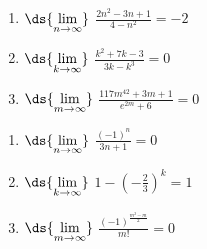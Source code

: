 \documentclass{ximera}
\begin{document}
\begin{multicols}{3}
\begin{enumerate}
\setcounter{enumi}{\value{HW}}

\item  $\ds{\lim_{n \rightarrow \infty}}$ $\frac{2n^2 - 3n+1}{4-n^2} = -2$

\item  $\ds{\lim_{k \rightarrow \infty}}$ $\frac{k^2 +7k-3}{3k - k^3} = 0$

\item\label{limseqexlast}  $\ds{\lim_{m \rightarrow \infty}}$ $\frac{117m^{42} + 3m + 1}{e^{2m} + 6} = 0$

\setcounter{HW}{\value{enumi}}
\end{enumerate}
\end{multicols}

\begin{multicols}{3}
\begin{enumerate}
\setcounter{enumi}{\value{HW}}

\item  $\ds{\lim_{n \rightarrow \infty}}$ $\frac{(-1)^{n}}{3n+1} = 0$

\item  $\ds{\lim_{k \rightarrow \infty}}$ $1 - \left( - \frac{2}{3}  \right)^{k} = 1$

\item  $\ds{\lim_{m \rightarrow \infty}}$ $\frac{(-1)^{ \frac{m^2-m}{2}} }{m!} = 0$

\setcounter{HW}{\value{enumi}}
\end{enumerate}
\end{multicols}
\end{document}
